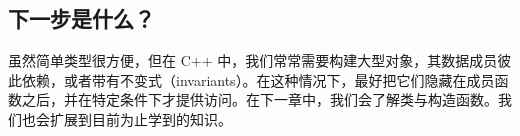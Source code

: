 \subsection{下一步是什么？}

虽然简单类型很方便，但在 C++ 中，我们常常需要构建大型对象，其数据成员彼此依赖，或者带有不变式（invariants）。在这种情况下，最好把它们隐藏在成员函数之后，并在特定条件下才提供访问。在下一章中，我们会了解类与构造函数。我们也会扩展到目前为止学到的知识。
